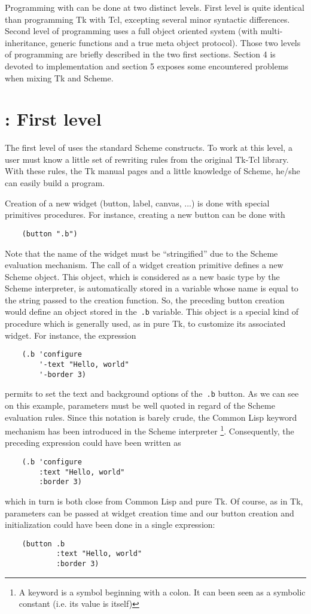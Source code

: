 Programming with {\stk} can be done at two distinct levels. First level is
quite identical than programming Tk with Tcl, excepting several minor
syntactic differences. Second level of programming uses a full object oriented
system (with multi-inheritance, generic functions and a true meta object
protocol). Those two levels of programming are briefly described in the two first
sections. Section 4 is devoted to implementation and section 5 exposes some
encountered problems when mixing Tk and Scheme.

\section{\stk: First level}

The first level of {\stk} uses the standard Scheme constructs. To work at
this level, a user must know a little set of rewriting rules from the
original Tk-Tcl library. With these rules, the Tk manual pages and a little
knowledge of Scheme, he/she can easily build a {\stk} program.

Creation of a new widget (button, label, canvas, ...) is done with special \stk
primitives procedures. For instance, creating a new button can be done with
\begin{verbatim}
    (button ".b")
\end{verbatim}
Note that the name of the widget must be ``stringified'' due to the Scheme
evaluation mechanism. The call of a widget creation primitive defines a new
Scheme object. This object, which is considered as a new basic type by the
Scheme interpreter, is automatically stored in a variable whose name is equal
to the string passed to the creation function. So, the preceding button
creation would define an object stored in the~{\tt .b} variable. This object
is a special kind of procedure which is generally used, as in pure Tk, to
customize its associated widget. For instance, the expression {\small
\begin{verbatim}
    (.b 'configure 
        '-text "Hello, world" 
        '-border 3)
\end{verbatim}
}
\noindent
permits to set the text and background options of the~{\tt .b} button. As
we can see on this example, parameters must be well quoted in regard of the 
Scheme evaluation rules. Since this notation is barely crude, the Common Lisp
keyword mechanism has been introduced in the Scheme interpreter {\cite{CLtl2}}
{\footnote{A keyword is a symbol beginning with a colon. It can been seen
as a symbolic constant (i.e. its value is itself)}}. Consequently, the preceding
expression could have been written as  
\noindent
{\small
\begin{verbatim}
    (.b 'configure 
        :text "Hello, world" 
        :border 3)
\end{verbatim}
}
\noindent
which in turn is both close from Common Lisp and pure Tk. Of course, as in
Tk, parameters can be passed at widget creation time and our button creation
and initialization could have been done in a single expression:
{\small
\begin{verbatim}
    (button .b 
            :text "Hello, world" 
            :border 3)
\end{verbatim}
}

